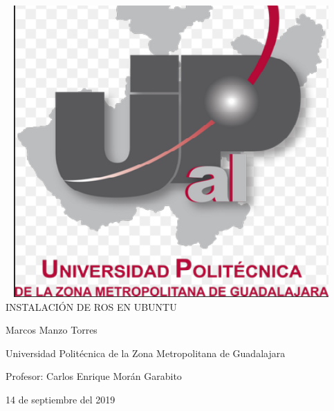 \documentclass[11pt,a4paper,oldfontcommands]{memoir}
\begin{document}
%
%
\thispagestyle{empty}

{%
\sffamily
\centering
\Large

~\vspace{\fill}
\includegraphics[scale=.5]{marcos.png}
{\huge 
INSTALACIÓN DE ROS EN UBUNTU
}

\vspace{2.5cm}

{\LARGE
Marcos Manzo Torres
}

\vspace{3.5cm}

Universidad Politécnica de la Zona Metropolitana de Guadalajara

\vspace{3.5cm}

Profesor: Carlos Enrique Morán Garabito

\vspace{\fill}

14 de septiembre del 2019

}%

\vspace{1.5cm}




\tableofcontents*

\clearpage
\end{document}

